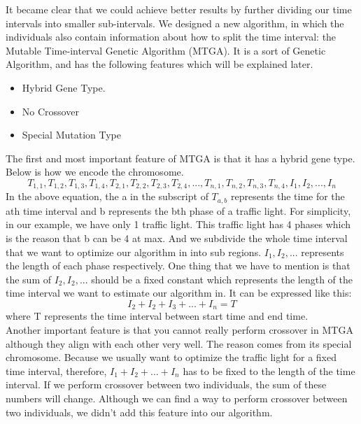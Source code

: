 \documentclass{article} %
\begin{document}
It became clear that we could achieve better results by further dividing our time intervals into smaller sub-intervals. We designed a new algorithm, in which the individuals also contain information about how to split the time interval: the Mutable Time-interval Genetic Algorithm (MTGA). It is a sort of Genetic Algorithm, and has the following features which will be explained later.
\begin{itemize}
	\item Hybrid Gene Type.
	\item No Crossover
	\item Special Mutation Type
\end{itemize}
The first and most important feature of MTGA is that it has a hybrid gene type. Below is how we encode the chromosome.
\begin{equation}
T_{1,1}, T_{1,2}, T_{1,3}, T_{1,4},T_{2,1}, T_{2,2}, T_{2,3}, T_{2,4},...,T_{n,1}, T_{n, 2},T_{n,3}, T_{n, 4},I_1, I_2, ..., I_n
\end{equation}
In the above equation, the a in the subscript of $T_{a,b}$ represents the time for the ath time interval and b represents the bth phase of a traffic light. For simplicity, in our example, we have only 1 traffic light. This traffic light has 4 phases which is the reason that b can be 4 at max. And we subdivide the whole time interval that we want to optimize our algorithm in into  sub regions. $I_1, I_2, ...$ represents the length of each phase respectively. One thing that we have to mention is that the sum of $I_2, I_2, ...$ should be a fixed constant which represents the length of the time interval we want to estimate our algorithm in. It can be expressed like this:
\begin{equation}
\label{equ_sum_fixed}
I_2 + I_2 + I_3 + ... + I_n = T
\end{equation} 
where T represents the time interval between start time and end time.\\

Another important feature is that you cannot really perform crossover in MTGA although they align with each other very well. The reason comes from its special chromosome. Because we usually want to optimize the traffic light for a fixed time interval, therefore, $I_1 + I_2 + ... + I_n$ has to be fixed to the length of the time interval. If we perform crossover between two individuals, the sum of these numbers will change. Although we can find a way to perform crossover between two individuals, we didn't add this feature into our algorithm.
\end{document}
